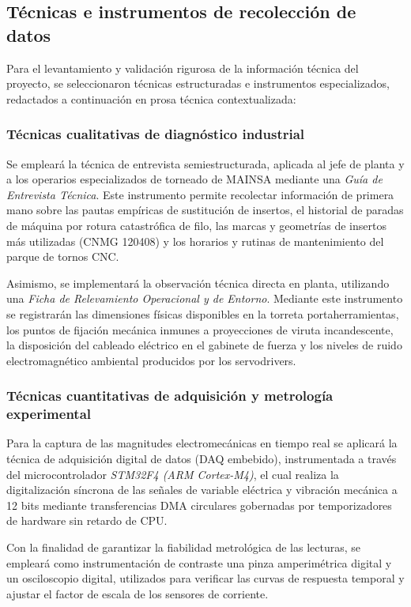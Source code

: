 \subsection{Técnicas e instrumentos de recolección de datos}
Para el levantamiento y validación rigurosa de la información técnica del proyecto, se seleccionaron técnicas estructuradas e instrumentos especializados, redactados a continuación en prosa técnica contextualizada:

\subsubsection{Técnicas cualitativas de diagnóstico industrial}
Se empleará la técnica de entrevista semiestructurada, aplicada al jefe de planta y a los operarios especializados de torneado de MAINSA mediante una \textit{Guía de Entrevista Técnica}. Este instrumento permite recolectar información de primera mano sobre las pautas empíricas de sustitución de insertos, el historial de paradas de máquina por rotura catastrófica de filo, las marcas y geometrías de insertos más utilizadas (CNMG 120408) y los horarios y rutinas de mantenimiento del parque de tornos CNC.

Asimismo, se implementará la observación técnica directa en planta, utilizando una \textit{Ficha de Relevamiento Operacional y de Entorno}. Mediante este instrumento se registrarán las dimensiones físicas disponibles en la torreta portaherramientas, los puntos de fijación mecánica inmunes a proyecciones de viruta incandescente, la disposición del cableado eléctrico en el gabinete de fuerza y los niveles de ruido electromagnético ambiental producidos por los servodrivers.

\subsubsection{Técnicas cuantitativas de adquisición y metrología experimental}
Para la captura de las magnitudes electromecánicas en tiempo real se aplicará la técnica de adquisición digital de datos (DAQ embebido), instrumentada a través del microcontrolador \textit{STM32F4 (ARM Cortex-M4)}, el cual realiza la digitalización síncrona de las señales de variable eléctrica y vibración mecánica a 12 bits mediante transferencias DMA circulares gobernadas por temporizadores de hardware sin retardo de CPU.

Con la finalidad de garantizar la fiabilidad metrológica de las lecturas, se empleará como instrumentación de contraste una pinza amperimétrica digital y un osciloscopio digital, utilizados para verificar las curvas de respuesta temporal y ajustar el factor de escala de los sensores de corriente.

